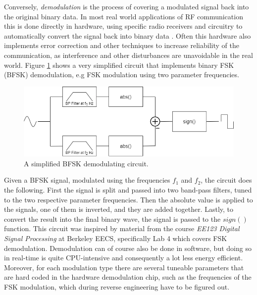 Conversely, \textit{demodulation} is the process of covering a modulated signal back into the original binary data. In most real world applications of RF communication this is done directly in hardware, using specific radio receivers and circuitry to automatically convert the signal back into binary data \cite{rf-modulation}. Often this hardware also implements error correction and other techniques to increase reliability of the communication, as interference and other disturbances are unavoidable in the real world. Figure \ref{fig:bfsk-demodulator} shows a very simplified circuit that implements binary FSK (BFSK) demodulation, e.g FSK modulation using two parameter frequencies.
\begin{figure}[!ht]
    \centering
    \includegraphics[width=\textwidth]{images/6-pentesting/bfsk-demodulator.png}
    \caption{A simplified BFSK demodulating circuit.}
    \label{fig:bfsk-demodulator}
\end{figure}
Given a BFSK signal, modulated using the frequencies $f_1$ and $f_2$, the circuit does the following. First the signal is split and passed into two band-pass filters, tuned to the two respective parameter frequencies. Then the absolute value is applied to the signals, one of them is inverted, and they are added together. Lastly, to convert the result into the final binary wave, the signal is passed to the $sign()$ function. This circuit was inspired by material from the course \textit{EE123 Digital Signal Processing} at Berkeley EECS, specifically Lab 4 which covers FSK demodulation. Demodulation can of course also be done in software, but doing so in real-time is quite CPU-intensive and consequently a lot less energy efficient. Moreover, for each modulation type there are several tuneable parameters that are hard coded in the hardware demodulation chip, such as the frequencies of the FSK modulation, which during reverse engineering have to be figured out.


